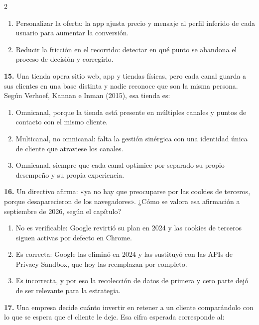 \documentclass[10pt,letterpaper]{article}
\begin{document}
\begin{multicols}{2}
\begin{enumerate}[label=\alph*),leftmargin=1.1em,itemsep=0pt,topsep=1pt,parsep=0pt,partopsep=0pt]
\item Personalizar la oferta: la app ajusta precio y mensaje al perfil inferido de cada usuario para aumentar la conversión.
\item Reducir la fricción en el recorrido: detectar en qué punto se abandona el proceso de decisión y corregirlo.
\end{enumerate}
\vspace{2pt}
\noindent\textbf{15.} Una tienda opera sitio web, app y tiendas físicas, pero cada canal guarda a sus clientes en una base distinta y nadie reconoce que son la misma persona. Según Verhoef, Kannan e Inman (2015), esa tienda es:
\vspace{-3pt}
\begin{enumerate}[label=\alph*),leftmargin=1.1em,itemsep=0pt,topsep=1pt,parsep=0pt,partopsep=0pt]
\item Omnicanal, porque la tienda está presente en múltiples canales y puntos de contacto con el mismo cliente.
\item Multicanal, no omnicanal: falta la gestión sinérgica con una identidad única de cliente que atraviese los canales.
\item Omnicanal, siempre que cada canal optimice por separado su propio desempeño y su propia experiencia.
\end{enumerate}
\vspace{2pt}
\noindent\textbf{16.} Un directivo afirma: «ya no hay que preocuparse por las cookies de terceros, porque desaparecieron de los navegadores». ¿Cómo se valora esa afirmación a septiembre de 2026, según el capítulo?
\vspace{-3pt}
\begin{enumerate}[label=\alph*),leftmargin=1.1em,itemsep=0pt,topsep=1pt,parsep=0pt,partopsep=0pt]
\item No es verificable: Google revirtió su plan en 2024 y las cookies de terceros siguen activas por defecto en Chrome.
\item Es correcta: Google las eliminó en 2024 y las sustituyó con las APIs de Privacy Sandbox, que hoy las reemplazan por completo.
\item Es incorrecta, y por eso la recolección de datos de primera y cero parte dejó de ser relevante para la estrategia.
\end{enumerate}
\vspace{2pt}
\noindent\textbf{17.} Una empresa decide cuánto invertir en retener a un cliente comparándolo con lo que se espera que el cliente le deje. Esa cifra esperada corresponde al:

\end{multicols}
\end{document}
